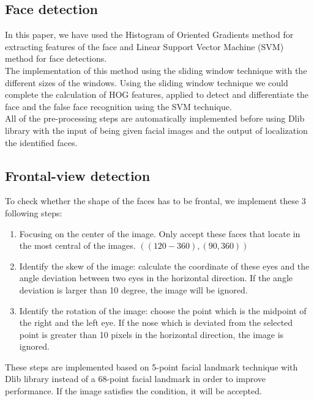 \documentclass[journal, twocolumn]{IEEEtran}
\begin{document}
\subsection{Face detection}
\label{face-detection}

In this paper, we have used the Histogram of Oriented Gradients method for extracting features of the face and Linear Support Vector Machine (SVM) method for face detections.\\
The implementation of this method using the sliding window technique with the different sizes of the windows. Using the sliding window technique we could complete the calculation of HOG features, applied to detect and differentiate the face and the false face recognition using the SVM technique.\\
All of the pre-processing steps are automatically implemented before using Dlib library with the input of being given facial images and the output of localization the identified faces.\\


\subsection{Frontal-view detection}
\label{frontal-view-detection}

To check whether the shape of the faces has to be frontal, we implement these 3 following steps:
\begin{enumerate}[Step 1.]
    \item Focusing on the center of the image. Only accept these faces that locate in the most central of the images. $((120-360), (90,360))$
    \item Identify the skew of the image: calculate the coordinate of these eyes and the angle deviation between two eyes in the horizontal direction. If the angle deviation is larger than 10 degree, the image will be ignored.
    \item Identify the rotation of the image: choose the point which is the midpoint of the right and the left eye. If the nose which is deviated from the selected point is greater than 10 pixels in the horizontal direction, the image is ignored.
\end{enumerate}
These steps are implemented based on 5-point facial landmark technique with Dlib library instead of a 68-point facial landmark in order to improve performance. If the image satisfies the condition, it will be accepted.
\end{document}
